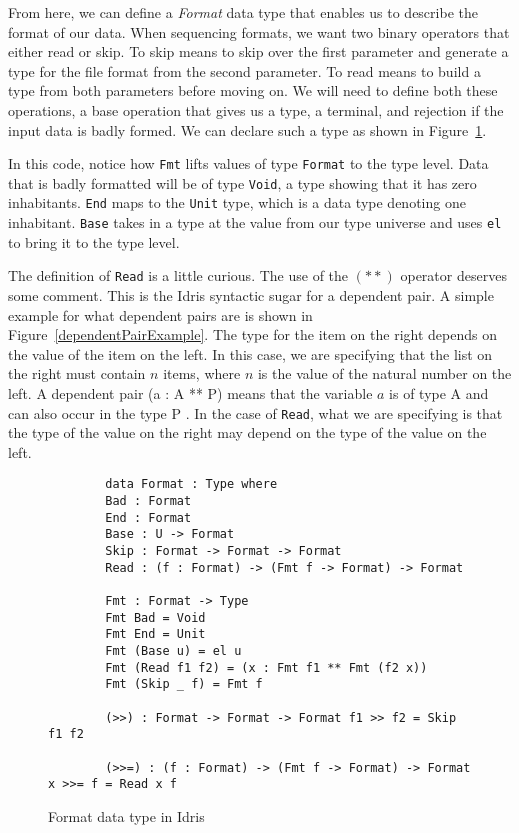 From here, we can define a \textit{Format} data type that enables us to describe
the format of our data. When sequencing formats, we want two binary operators
that either read or skip. To skip means to skip over the first parameter and
generate a type for the file format from the second parameter. To read means to
build a type from both parameters before moving on. We will need to define both
these operations, a base operation that gives us a type, a terminal, and
rejection if the input data is badly formed. We can declare such a type as
shown in Figure~\ref{formatDeclaration}. 

In this code, notice how \texttt{Fmt} lifts values of type \texttt{Format} to
the type level. Data that is badly formatted will be of type \texttt{Void}, a
type showing that it has zero inhabitants. \texttt{End} maps to the
\texttt{Unit} type, which is a data type denoting one inhabitant. \texttt{Base}
takes in a type at the value from our type universe and uses \texttt{el} to
bring it to the type level. 

The definition of \texttt{Read} is a little curious. The use of the $(**)$
operator deserves some comment. This is the Idris syntactic sugar for a
dependent pair. A simple example for what dependent pairs are is shown in
Figure~\ref{dependentPairExample}. The type for the item on the right depends on
the value of the item on the left. In this case, we are specifying that the list
on the right must contain $n$ items, where $n$ is the value of the natural
number on the left. A dependent pair (a : A ** P) means that the variable $a$ is
of type A and can also occur in the type P \cite{tdd_book}. In the case of
\texttt{Read}, what we are specifying is that the type of the value on the right
may depend on the type of the value on the left. 

\begin{figure}[ht!!!!!!]
    \caption{Format data type in Idris \protect\cite{power_of_pi}}
    \label{formatDeclaration}
    \begin{lstlisting}
        data Format : Type where 
        Bad : Format 
        End : Format
        Base : U -> Format
        Skip : Format -> Format -> Format 
        Read : (f : Format) -> (Fmt f -> Format) -> Format

        Fmt : Format -> Type 
        Fmt Bad = Void 
        Fmt End = Unit 
        Fmt (Base u) = el u
        Fmt (Read f1 f2) = (x : Fmt f1 ** Fmt (f2 x)) 
        Fmt (Skip _ f) = Fmt f

        (>>) : Format -> Format -> Format f1 >> f2 = Skip f1 f2

        (>>=) : (f : Format) -> (Fmt f -> Format) -> Format x >>= f = Read x f
    \end{lstlisting}
\end{figure}

